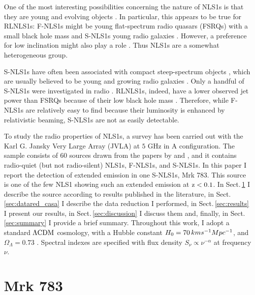 \documentclass[../main.tex]{subfiles}
\begin{document}
One of the most interesting possibilities concerning the nature of NLS1s is that they are young and evolving objects \citep{Mathur00}.
In particular, this appears to be true for RLNLS1s: F-NLS1s might be young flat-spectrum radio quasars (FSRQs) with a small black hole mass and S-NLS1s young radio galaxies \citep{Foschini15, Berton16c}.
However, a preference for low inclination might also play a role \citep[e.g.,][]{Shen14,Peterson11}.
Thus NLS1s are a somewhat heterogeneous group.

S-NLS1s have often been associated with compact steep-spectrum objects \citep[CSS;][]{Oshlack01, Komossa06, Gallo06a, Yuan08, Caccianiga14, Gu15, Schulz16, Berton16c, Caccianiga17}, which are usually believed to be young and growing radio galaxies \citep{Fanti95}. 
Only a handful of S-NLS1s were investigated in radio \citep{Whalen06, Anton08, Doi12, Richards15, Doi15, Gu15, Caccianiga17}. 
RLNLS1s, indeed, have a lower observed jet power than FSRQs \citep{Foschini15} because of their low black hole mass \citep{Heinz03,Foschini14}.
Therefore, while F-NLS1s are relatively easy to find because their luminosity is enhanced by relativistic beaming, S-NLS1s are not as easily detectable.

To study the radio properties of NLS1s, a survey has been carried out with the Karl G. Jansky Very Large Array (JVLA) at $5$ GHz in A configuration.
The sample consists of 60 sources drawn from the papers by \citet{Foschini15} and \citet{Berton15a}, and it contains radio-quiet (but not radio-silent) NLS1s, F-NLS1s, and S-NLS1s.
In this paper I report the detection of extended emission in one S-NLS1s, Mrk 783. 
This source is one of the few NLS1 showing such an extended emission at $\rm z<0.1$.  
In Sect.\,\ref{sec:mrk783} I describe the source according to results published in the literature, in Sect.\,\ref{sec:datared_casa} I describe the data reduction I performed, in Sect.\,\ref{sec:results} I present our results, in Sect.\,\ref{sec:discussion} I discuss them and, finally, in Sect.\,\ref{sec:summary} I provide a brief summary. 
Throughout this work, I adopt a standard $\rm \Lambda CDM$ cosmology, with a Hubble constant $H_0 = 70\,km s^{-1} Mpc^{-1}$, and $\Omega_\Lambda = 0.73$ \citep{Komatsu11}.
Spectral indexes are specified with flux density $S_{\nu} \propto \nu^{-\alpha}$ at frequency $\nu$.


\section{Mrk 783}
\label{sec:mrk783}
\end{document}
